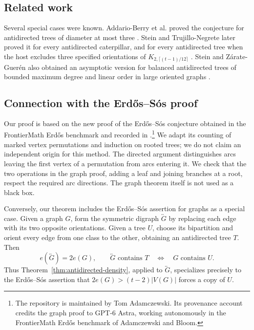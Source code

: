 \documentclass[11pt]{article}
\numberwithin{equation}{section}
\theoremstyle{definition}
\begin{document}
\subsection{Related work}

Several special cases were known.  Addario-Berry et al. proved the
conjecture for antidirected trees of diameter at most three
\cite{AddarioBerryHavetLinharesSalesReedThomasse2013}.  Stein and
Trujillo-Negrete later proved it for every antidirected caterpillar, and for
every antidirected tree when the host excludes three specified orientations
of $K_{2,\lceil (t-1)/12\rceil}$
\cite{SteinTrujilloNegrete2025}.  Stein and Z\'arate-Guer\'en also obtained
an asymptotic version for balanced antidirected trees of bounded maximum
degree and linear order in large oriented graphs
\cite{SteinZarateGueren2024}.

\subsection{Connection with the Erd\H{o}s--S\'os proof}

Our proof is based on the new proof of the Erd\H{o}s--S\'os conjecture
obtained in the FrontierMath Erd\H{o}s benchmark and recorded in
\cite{Erdos548Repository}.\footnote{The repository is maintained by
Tom Adamczewski.  Its provenance account credits the graph proof to
GPT-6 Astra, working autonomously in the FrontierMath Erd\H{o}s
benchmark of Adamczewski and Bloom.}
We adapt its counting of marked vertex permutations and induction on
rooted trees; we do not claim an independent origin for this method.
The directed argument distinguishes arcs leaving the first vertex of
a permutation from arcs entering it.  We check that the two operations
in the graph proof, adding a leaf and joining branches at a root,
respect the required arc directions.  The graph theorem itself is not
used as a black box.

Conversely, our theorem includes the Erd\H{o}s--S\'os assertion for
graphs as a special case.  Given a
graph $G$, form the symmetric digraph $\overleftrightarrow{G}$ by replacing
each edge with its two opposite orientations.  Given a tree $U$, choose its
bipartition and orient every edge from one class to the other, obtaining an
antidirected tree $T$.  Then
\[
 e(\overleftrightarrow{G})=2e(G),
 \qquad
 \overleftrightarrow{G}\text{ contains }T
 \quad\Longleftrightarrow\quad
 G\text{ contains }U.
\]
Thus Theorem~\ref{thm:antidirected-density}, applied to
$\overleftrightarrow{G}$, specializes precisely to the Erd\H{o}s--S\'os
assertion that $2e(G)>(t-2)|V(G)|$ forces a copy of $U$.
\end{document}
